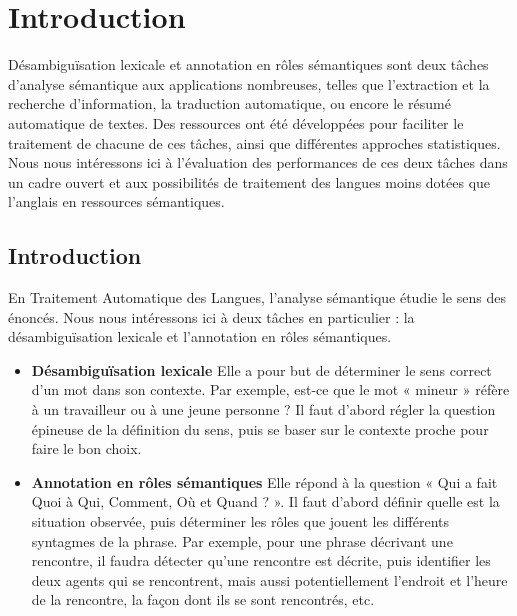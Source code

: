 \chapter{Introduction}
\label{ch:intro}

Désambiguïsation lexicale et annotation en rôles sémantiques sont deux tâches
d'analyse sémantique aux applications nombreuses, telles que l'extraction et la
recherche d'information, la traduction automatique, ou encore le résumé
automatique de textes. Des ressources ont été développées pour faciliter le
traitement de chacune de ces tâches, ainsi que différentes approches
statistiques. Nous nous intéressons ici à l'évaluation des performances de ces
deux tâches dans un cadre ouvert et aux possibilités de traitement des langues
moins dotées que l'anglais en ressources sémantiques.

\section{Introduction}


En Traitement Automatique des Langues, l'analyse sémantique étudie le sens des
énoncés. Nous nous intéressons ici à deux tâches en particulier : la
désambiguïsation lexicale et l'annotation en rôles sémantiques.

\begin{itemize}

  \item \textbf{Désambiguïsation lexicale} Elle a pour but de déterminer le
      sens correct d'un mot dans son contexte. Par exemple, est-ce que le mot «
      mineur » réfère à un travailleur ou à une jeune personne ? Il faut
      d'abord régler la question épineuse de la définition du sens, puis se
      baser sur le contexte proche pour faire le bon choix.

  \item \textbf{Annotation en rôles sémantiques} Elle répond à la question «
      Qui a fait Quoi à Qui, Comment, Où et Quand ? ». Il faut d'abord définir
      quelle est la situation observée, puis déterminer les rôles que jouent
      les différents syntagmes de la phrase. Par exemple, pour une phrase
      décrivant une rencontre, il faudra détecter qu'une rencontre est décrite,
      puis identifier les deux agents qui se rencontrent, mais aussi
      potentiellement l'endroit et l'heure de la rencontre, la façon dont ils
      se sont rencontrés, etc.

\end{itemize}

